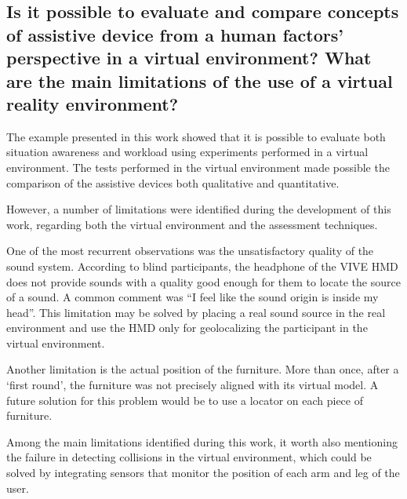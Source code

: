 

\subsection*{Is it possible to evaluate and compare concepts of assistive device from a human factors’ perspective in a virtual environment? What are the main limitations of the use of a virtual reality environment?
}

The example presented in this work showed that it is possible to evaluate both situation awareness and workload using experiments performed in a virtual environment. The tests performed in the virtual environment made possible the comparison of the assistive devices both qualitative and quantitative.

However, a number of limitations were identified during the development of this work, regarding both the virtual environment and the assessment techniques.

One of the most recurrent observations was the unsatisfactory quality of the sound system. According to blind participants, the headphone of the VIVE HMD does not provide sounds with a quality good enough for them to locate the source of a sound. A common comment was “I feel like the sound origin is inside my head”. This limitation may be solved by placing a real sound source in the real environment and use the HMD only for geolocalizing the participant in the virtual environment.

Another limitation is the actual position of the furniture. More than once, after a ‘first round’, the furniture was not precisely aligned with its virtual model. A future solution for this problem would be to use a locator on each piece of furniture.

Among the main limitations identified during this work, it worth also mentioning the failure in detecting collisions in the virtual environment, which could be solved by integrating sensors that monitor the position of each arm and leg of the user.

